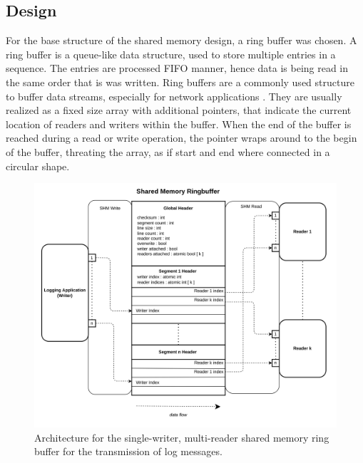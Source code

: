 \subsection{Design} \label{sec:rbuf_design}
For the base structure of the shared memory design, a ring buffer was chosen. A ring buffer is a queue-like data structure, used to store
multiple entries in a sequence. The entries are processed \ac{FIFO} manner, hence data is being read in the same order that is was written. 
Ring buffers are a commonly used structure to buffer data streams, especially for network applications \cite{barrington2015}.
They are usually realized as a fixed size array with additional pointers, that indicate the current location
of readers and writers within the buffer. When the end of the buffer is reached during a read or write operation, the pointer
wraps around to the begin of the buffer, threating the array, as if start and end where connected in a circular shape. 

\begin{figure}[h!]
    \label{fig:shm_architecture}
    \includegraphics[width=\textwidth]{images/shm_architecture.png}
    \caption[Shared Memory Architecture]{Architecture for the single-writer, multi-reader shared memory ring buffer for the transmission
    of log messages. }
\end{figure}

